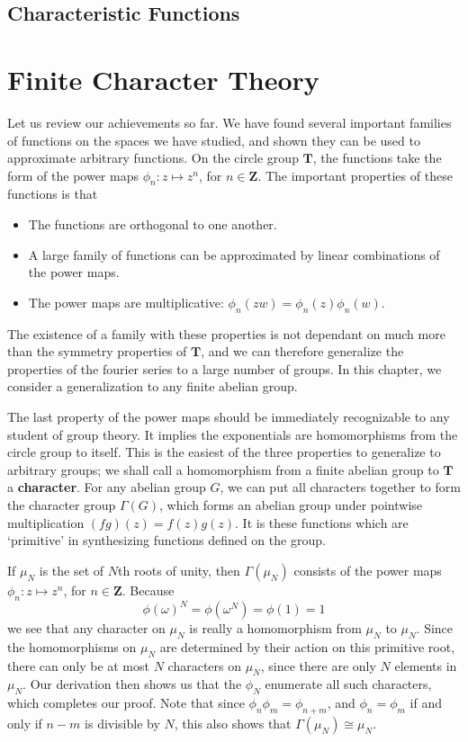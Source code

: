 \section{Characteristic Functions}




\chapter{Finite Character Theory}

Let us review our achievements so far. We have found several important families of functions on the spaces we have studied, and shown they can be used to approximate arbitrary functions. On the circle group $\mathbf{T}$, the functions take the form of the power maps $\phi_n: z \mapsto z^n$, for $n \in \mathbf{Z}$. The important properties of these functions is that
%
\begin{itemize}
    \item The functions are orthogonal to one another.
    \item A large family of functions can be approximated by linear combinations of the power maps.
    \item The power maps are multiplicative: $\phi_n(zw) = \phi_n(z) \phi_n(w)$.
\end{itemize}
%
The existence of a family with these properties is not dependant on much more than the symmetry properties of $\mathbf{T}$, and we can therefore generalize the properties of the fourier series to a large number of groups. In this chapter, we consider a generalization to any finite abelian group.

The last property of the power maps should be immediately recognizable to any student of group theory. It implies the exponentials are homomorphisms from the circle group to itself. This is the easiest of the three properties to generalize to arbitrary groups; we shall call a homomorphism from a finite abelian group to $\mathbf{T}$ a {\bf character}. For any abelian group $G$, we can put all characters together to form the character group $\Gamma(G)$, which forms an abelian group under pointwise multiplication $(fg)(z) = f(z)g(z)$. It is these functions which are `primitive' in synthesizing functions defined on the group.

\begin{example}
    If $\mu_N$ is the set of $N$th roots of unity, then $\Gamma(\mu_N)$ consists of the power maps $\phi_n: z \mapsto z^n$, for $n \in \mathbf{Z}$. Because
    \[ \phi(\omega)^N = \phi(\omega^N) = \phi(1) = 1 \]
    we see that any character on $\mu_N$ is really a homomorphism from $\mu_N$ to $\mu_N$. Since the homomorphisms on $\mu_N$ are determined by their action on this primitive root, there can only be at most $N$ characters on $\mu_N$, since there are only $N$ elements in $\mu_N$. Our derivation then shows us that the $\phi_N$ enumerate all such characters, which completes our proof. Note that since $\phi_n \phi_m = \phi_{n+m}$, and $\phi_n = \phi_m$ if and only if $n - m$ is divisible by $N$, this also shows that $\Gamma(\mu_N) \cong \mu_N$.
\end{example}

